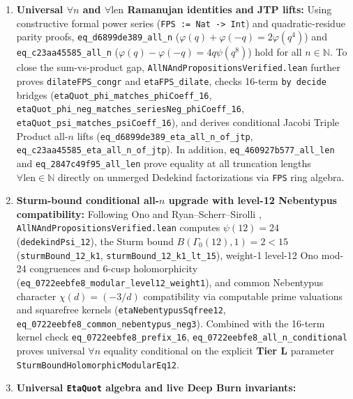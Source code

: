 \documentclass[11pt,a4paper]{article}
\theoremstyle{plain}
\theoremstyle{definition}
\theoremstyle{remark}
\newcommand{\tierL}{\textbf{Tier L}}
\begin{document}
\begin{enumerate}
  \item \textbf{Universal $\forall n$ and $\forall \text{len}$ Ramanujan identities and JTP lifts:}
    Using constructive formal power series (\texttt{FPS := Nat -> Int}) and quadratic-residue parity proofs, \texttt{eq\_d6899de389\_all\_n} ($\varphi(q)+\varphi(-q)=2\varphi(q^4)$) and \texttt{eq\_c23aa45585\_all\_n} ($\varphi(q)-\varphi(-q)=4q\psi(q^8)$) hold for all $n \in \mathbb{N}$. To close the sum-vs-product gap, \texttt{AllNAndPropositionsVerified.lean} further proves \texttt{dilateFPS\_congr} and \texttt{etaFPS\_dilate}, checks 16-term \texttt{by decide} bridges (\texttt{etaQuot\_phi\_matches\_phiCoeff\_16}, \texttt{etaQuot\_phi\_neg\_matches\_seriesNeg\_phiCoeff\_16}, \texttt{etaQuot\_psi\_matches\_psiCoeff\_16}), and derives conditional Jacobi Triple Product all-$n$ lifts (\texttt{eq\_d6899de389\_eta\_all\_n\_of\_jtp}, \texttt{eq\_c23aa45585\_eta\_all\_n\_of\_jtp}). In addition, \texttt{eq\_460927b577\_all\_len} and \texttt{eq\_2847c49f95\_all\_len} prove equality at all truncation lengths $\forall \text{len} \in \mathbb{N}$ directly on unmerged Dedekind factorizations via \texttt{FPS} ring algebra.
  \item \textbf{Sturm-bound conditional all-$n$ upgrade with level-12 Nebentypus compatibility:}
    Following Ono \cite{Ono2004} and Ryan--Scherr--Sirolli \cite{RyanScherrSirolli2019}, \texttt{AllNAndPropositionsVerified.lean} computes $\psi(12) = 24$ (\texttt{dedekindPsi\_12}), the Sturm bound $B(\Gamma_0(12), 1) = 2 < 15$ (\texttt{sturmBound\_12\_k1}, \texttt{sturmBound\_12\_k1\_lt\_15}), weight-1 level-12 Ono mod-24 congruences and 6-cusp holomorphicity (\texttt{eq\_0722eebfe8\_modular\_level12\_weight1}), and common Nebentypus character $\chi(d) = (-3/d)$ compatibility via computable prime valuations and squarefree kernels (\texttt{etaNebentypusSqfree12}, \texttt{eq\_0722eebfe8\_common\_nebentypus\_neg3}). Combined with the 16-term kernel check \texttt{eq\_0722eebfe8\_prefix\_16}, \texttt{eq\_0722eebfe8\_all\_n\_conditional} proves universal $\forall n$ equality conditional on the explicit \tierL{} parameter \texttt{SturmBoundHolomorphicModularEq12}.
  \item \textbf{Universal \texttt{EtaQuot} algebra and live Deep Burn invariants:}

\end{enumerate}
\end{document}
